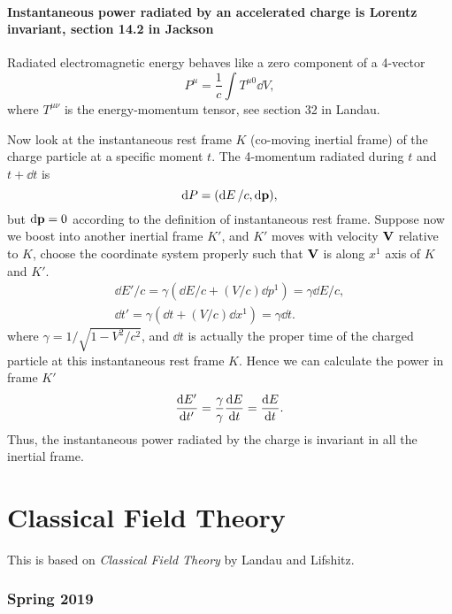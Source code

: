 \documentclass[10pt]{article}
\begin{document}
\subsection{Instantaneous power radiated by an accelerated charge is Lorentz invariant, section 14.2 in Jackson}
Radiated electromagnetic energy behaves like a zero component of a 4-vector
\begin{equation}
	P^{\mu} = \frac{1}{c} \int T^{\mu 0} \dd{V},
\end{equation}
where $T^{\mu \nu}$ is the energy-momentum tensor, see section 32 in Landau.

Now look at the instantaneous rest frame $K$ (co-moving inertial frame) of the charge particle at a specific moment $t$. The 4-momentum radiated during $t$ and $t + \dd{t}$ is
\begin{equation}
	\dd{P} = (\dd{E}/c, \dd{\vb{p}}),
\end{equation}
but $\dd{\vb{p}} = 0$ according to the definition of instantaneous rest frame. Suppose now we boost into another inertial frame $K'$, and $K'$ moves with velocity $\vb{V}$ relative to $K$, choose the coordinate system properly such that $\vb{V}$ is along $x^1$ axis of $K$ and $K'$.
\begin{gather}
	\dd{E'}/c = \gamma (\dd{E}/c + (V/c) \dd{p}^1) = \gamma \dd{E}/c, \\
	\dd{t'} = \gamma (\dd{t} + (V/c) \dd{x}^1) = \gamma \dd{t}.
\end{gather}
where $\gamma = 1/\sqrt{1-V^2/c^2}$, and $\dd{t}$ is actually the proper time of the charged particle at this instantaneous rest frame $K$. Hence we can calculate the power in frame $K'$
\begin{equation}
	\dv{E'}{t'} = \frac{\gamma}{\gamma} \dv{E}{t} = \dv{E}{t}.
\end{equation}
Thus, the instantaneous power radiated by the charge is invariant in all the inertial frame.



\part{Classical Field Theory}
This is based on \textit{Classical Field Theory} by Landau and Lifshitz.
\section{Spring 2019}
\end{document}
